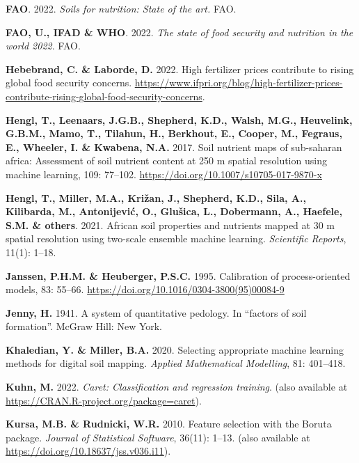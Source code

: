 \documentclass[
  10pt,
  b5paper,
  oneside]{book}
\newlength{\cslhangindent}
\newlength{\cslentryspacingunit} %
\newenvironment{CSLReferences}[2] %
 {%
  \setlength{\parindent}{0pt}
  \ifodd #1
  \let\oldpar\par
  \def\par{\hangindent=\cslhangindent\oldpar}
  \fi
  \setlength{\parskip}{#2\cslentryspacingunit}
 }%
 {}
\begin{document}
\begin{CSLReferences}{0}{0}
\leavevmode{}%
\textbf{FAO}. 2022. \emph{Soils for nutrition: State of the art.} FAO.

\leavevmode{}%
\textbf{FAO, U., IFAD \& WHO}. 2022. \emph{The state of food security and nutrition in the world 2022}. FAO.

\leavevmode{}%
\textbf{Hebebrand, C. \& Laborde, D.} 2022. High fertilizer prices contribute to rising global food security concerns. \url{https://www.ifpri.org/blog/high-fertilizer-prices-contribute-rising-global-food-security-concerns}.

\leavevmode{}%
\textbf{Hengl, T., Leenaars, J.G.B., Shepherd, K.D., Walsh, M.G., Heuvelink, G.B.M., Mamo, T., Tilahun, H., Berkhout, E., Cooper, M., Fegraus, E., Wheeler, I. \& Kwabena, N.A.} 2017. Soil nutrient maps of sub-saharan africa: Assessment of soil nutrient content at 250 m spatial resolution using machine learning, 109: 77--102. \url{https://doi.org/10.1007/s10705-017-9870-x}

\leavevmode{}%
\textbf{Hengl, T., Miller, M.A., Križan, J., Shepherd, K.D., Sila, A., Kilibarda, M., Antonijević, O., Glušica, L., Dobermann, A., Haefele, S.M. \& others}. 2021. African soil properties and nutrients mapped at 30 m spatial resolution using two-scale ensemble machine learning. \emph{Scientific Reports}, 11(1): 1--18.

\leavevmode{}%
\textbf{Janssen, P.H.M. \& Heuberger, P.S.C.} 1995. Calibration of process-oriented models, 83: 55--66. \url{https://doi.org/10.1016/0304-3800(95)00084-9}

\leavevmode{}%
\textbf{Jenny, H.} 1941. A system of quantitative pedology. In {``factors of soil formation''}. McGraw Hill: New York.

\leavevmode{}%
\textbf{Khaledian, Y. \& Miller, B.A.} 2020. Selecting appropriate machine learning methods for digital soil mapping. \emph{Applied Mathematical Modelling}, 81: 401--418.

\leavevmode{}%
\textbf{Kuhn, M.} 2022. \emph{Caret: Classification and regression training}. (also available at \url{https://CRAN.R-project.org/package=caret}).

\leavevmode{}%
\textbf{Kursa, M.B. \& Rudnicki, W.R.} 2010. Feature selection with the {Boruta} package. \emph{Journal of Statistical Software}, 36(11): 1--13. (also available at \url{https://doi.org/10.18637/jss.v036.i11}).


\end{CSLReferences}
\end{document}
